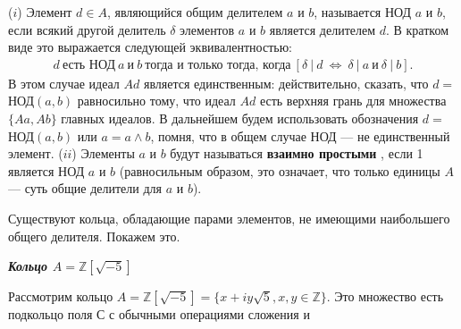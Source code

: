 \documentclass{../../template/mai_book}
\begin{document}
\begin{determ}
\textit{\indent} ($i$) Элемент $d \in A$, являющийся общим делителем $a$ и $b$, называется НОД $a$ и $b$, если всякий другой делитель $\delta$ элементов $a$ и $b$ является делителем $d$. В кратком виде это выражается следующей эквивалентностью:
\begin{align*}
d\:\text{есть НОД}\:a\:\text{и}\:b\:\text{тогда и только тогда, когда}\:[\delta\:|\:d\:\Longleftrightarrow\:\delta\:|\:a\:\text{и}\:\delta\:|\:b]\text{.}
\end{align*}
В этом случае идеал $Ad$ является единственным: действительно, сказать, что $d = $НОД$(a,b)$ равносильно тому, что идеал $Ad$ есть верхняя грань для множества $\{Aa, Ab\}$ главных идеалов. \newline \indent В дальнейшем будем использовать обозначения $d = $НОД$(a, b)$ или $a = a \wedge b$, помня, что в общем случае НОД — не единственный элемент. \newline \indent ($ii$) Элементы $a$ и $b$ будут называться \textbf{взаимно простыми} , если 1 является НОД $a$ и $b$ (равносильным образом, это означает, что только единицы $A$ — суть общие делители для $a$ и $b$).
\end{determ}

Существуют кольца, обладающие парами элементов, не имеющими наибольшего общего делителя. Покажем это.

\textit{\textbf{Кольцо $A = \mathds{Z}[\sqrt{-5}]$}}

Рассмотрим кольцо $A = \mathds{Z}[\sqrt{-5}] = \{x + iy\sqrt{5}, x, y \in \mathds{Z}\}$. Это множество есть подкольцо поля С с обычными операциями сложения и
\end{document}
